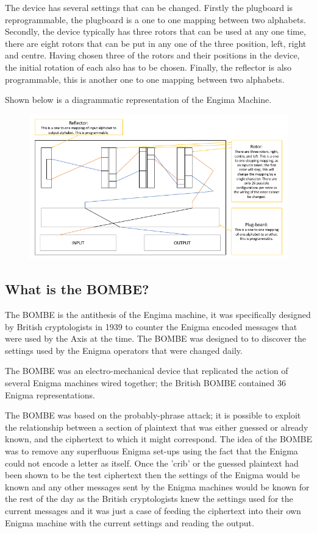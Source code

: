 \documentclass[12pt,a4paper]{article}
\begin{document}
The device has several settings that can be changed. Firstly the plugboard is reprogrammable, the plugboard is a one to one mapping between two alphabets. Secondly, the device typically has three rotors that can be used at any one time, there are eight rotors that can be put in any one of the three position, left, right and centre. Having chosen three of the rotors and their positions in the device, the initial rotation of each also has to be chosen. Finally, the reflector is also programmable, this is another one to one mapping between two alphabets.

Shown below is a diagrammatic representation of the Engima Machine.

\begin{figure}[h]
\centering
\includegraphics[width=\textwidth]{enigmaDiagram.png}
\end{figure}

\subsection{What is the BOMBE?}

The BOMBE is the antithesis of the Engima machine, it was specifically designed by British cryptologists in 1939 to counter the Enigma encoded messages that were used by the Axis at the time. The BOMBE was designed to to discover the settings used by the Enigma operators that were changed daily. 

The BOMBE was an electro-mechanical device that replicated the action of several Enigma machines wired together; the British BOMBE contained 36 Enigma representations.

The BOMBE was based on the probably-phrase attack; it is possible to exploit the relationship between a section of plaintext that was either guessed or already known, and the ciphertext to which it might correspond. The idea of the BOMBE was to remove any superfluous Enigma set-ups using the fact that the Enigma could not encode a letter as itself. Once the 'crib' or the guessed plaintext had been shown to be the test ciphertext then the settings of the Enigma would be known and any other messages sent by the Enigma machines would be known for the rest of the day as the British cryptologists knew the settings used for the current messages and it was just a case of feeding the ciphertext into their own Enigma machine with the current settings and reading the output.
\end{document}
